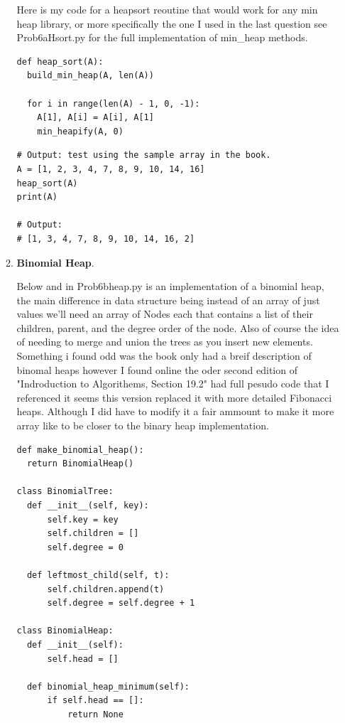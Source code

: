 \documentclass{article}
\begin{document}
\begin{enumerate}
\begin{enumerate}
    Here is my code for a heapsort reoutine that would work for any min heap library, or more specifically the one I used in the last question see Prob6aHsort.py for the full implementation of min\_heap methods.
    
    \begin{lstlisting}
def heap_sort(A):
  build_min_heap(A, len(A))

  for i in range(len(A) - 1, 0, -1):
    A[1], A[i] = A[i], A[1]
    min_heapify(A, 0)      
    \end{lstlisting}

    \begin{lstlisting}
# Output: test using the sample array in the book.
A = [1, 2, 3, 4, 7, 8, 9, 10, 14, 16]
heap_sort(A)
print(A)

# Output:
# [1, 3, 4, 7, 8, 9, 10, 14, 16, 2]
    \end{lstlisting}

    \item \textbf{Binomial Heap}.
    
    Below and in Prob6bheap.py is an implementation of a binomial heap, the main difference in data structure being instead of an array of just values we'll need an array of Nodes each that contains a list of their children, parent, and the degree order of the node.
    Also of course the idea of needing to merge and union the trees as you insert new elements.\\

    Something i found odd was the book only had a breif description of binomal heaps however I found online the oder second edition of "Indroduction to Algorithems, Section 19.2" had full pesudo code that I referenced it seems this version replaced it with more detailed Fibonacci heaps.
    Although I did have to modify it a fair ammount to make it more array like to be closer to the binary heap implementation.

    \begin{lstlisting}
def make_binomial_heap():
  return BinomialHeap()

class BinomialTree:
  def __init__(self, key):
      self.key = key
      self.children = []
      self.degree = 0

  def leftmost_child(self, t):
      self.children.append(t)
      self.degree = self.degree + 1

class BinomialHeap:
  def __init__(self):
      self.head = []

  def binomial_heap_minimum(self):
      if self.head == []:
          return None
      

\end{lstlisting}
\end{enumerate}
\end{enumerate}
\end{document}
